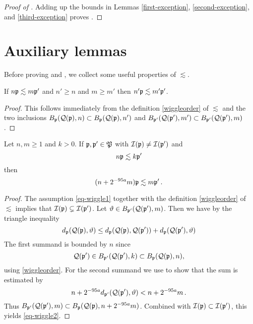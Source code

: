 \begin{proof}[Proof of ]
    \leanok
Adding up the bounds in Lemmas \ref{first-exception}, \ref{second-exception}, and \ref{third-exception} proves .
\end{proof}


\section{Auxiliary lemmas}
\label{subsec-lessim-aux}
Before proving  and , we collect some useful properties of $\lesssim$.

\begin{lemma}
    \label{wiggle-order-1}
    \leanok
    If $n{\mathfrak p} \lesssim m{\mathfrak p}'$ and
    $n' \ge n$ and $m \ge m'$ then $n'{\mathfrak p} \lesssim m'{\mathfrak p}'$.
\end{lemma}

\begin{proof}
    \leanok
    This follows immediately from the definition \eqref{wiggleorder} of $\lesssim$ and the two inclusions $B_{{\mathfrak p}}({\mathcal{Q}}({\mathfrak p}), n) \subset B_{{\mathfrak p}}({\mathcal{Q}}({\mathfrak p}), n')$ and $B_{{\mathfrak p}'}({\mathcal{Q}}({\mathfrak p}'), m') \subset B_{{\mathfrak p}'}({\mathcal{Q}}({\mathfrak p}'), m)$.
\end{proof}

\begin{lemma}
    \label{wiggle-order-2}
    \leanok

    Let $n, m \ge 1$ and $k > 0$.
    If ${\mathfrak p}, {\mathfrak p}' \in {\mathfrak P}$ with ${\mathcal{I}}({\mathfrak p}) \ne {\mathcal{I}}({\mathfrak p}')$ and
    \begin{equation}
        \label{eq-wiggle1}
        n {\mathfrak p} \lesssim k {\mathfrak p}'
    \end{equation}
    then
    \begin{equation}
        \label{eq-wiggle2}
        (n + 2^{-95 a} m) {\mathfrak p} \lesssim m{\mathfrak p}'\,.
    \end{equation}
\end{lemma}

\begin{proof}
    \leanok
    The assumption \eqref{eq-wiggle1} together with the definition \eqref{wiggleorder} of $\lesssim$ implies that ${\mathcal{I}}({\mathfrak p}) \subsetneq {\mathcal{I}}({\mathfrak p}')$. Let ${\vartheta} \in B_{{\mathfrak p}'}({\mathcal{Q}}({\mathfrak p}'), m)$. Then we have by the triangle inequality
    $$
        d_{{\mathfrak p}}({\mathcal{Q}}({\mathfrak p}), {\vartheta}) \le d_{{\mathfrak p}}({\mathcal{Q}}({\mathfrak p}), {\mathcal{Q}}({\mathfrak p}')) + d_{{\mathfrak p}}({\mathcal{Q}}({\mathfrak p}'), {\vartheta})
    $$
    The first summand is bounded by $n$ since
    $$
        {\mathcal{Q}}({\mathfrak p}') \in B_{{\mathfrak p}'}({\mathcal{Q}}({\mathfrak p}'), k) \subset B_{{\mathfrak p}}({\mathcal{Q}}({\mathfrak p}), n),
    $$
    using \eqref{wiggleorder}. For the second summand we use 
    to show that the sum is estimated by
    $$
        n + 2^{-95a} d_{{\mathfrak p}'}({\mathcal{Q}}({\mathfrak p}'), {\vartheta}) < n + 2^{-95a} m\,.
    $$
    Thus $B_{{\mathfrak p}'}({\mathcal{Q}}({\mathfrak p}'),m) \subset B_{{\mathfrak p}}({\mathcal{Q}}({\mathfrak p}),n + 2^{-95a}m)$. Combined with ${\mathcal{I}}({\mathfrak p}) \subset {\mathcal{I}}({\mathfrak p}')$, this yields \eqref{eq-wiggle2}.
\end{proof}

